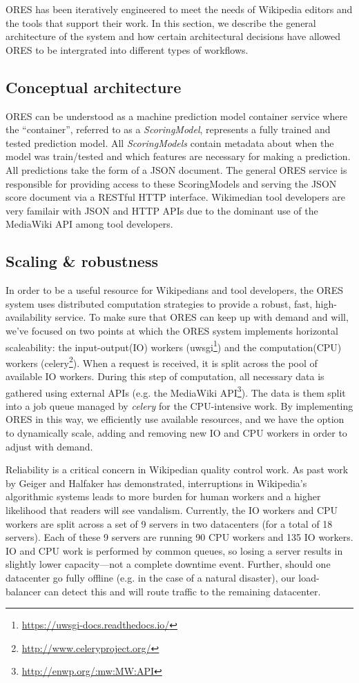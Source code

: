 ORES has been iteratively engineered to meet the needs of Wikipedia editors and the tools that support their work.  In this section, we describe the general architecture of the system and how certain architectural decisions have allowed ORES to be intergrated into different types of workflows.  

\subsection{Conceptual architecture}
ORES can be understood as a machine prediction model container service where the ``container'', referred to as a \emph{ScoringModel}, represents a fully trained and tested prediction model.  All \emph{ScoringModels} contain metadata about when the model was train/tested and which features are necessary for making a prediction.  All predictions take the form of a JSON document.  The general ORES service is responsible for providing access to these ScoringModels and serving the JSON score document via a RESTful HTTP interface.  Wikimedian tool developers are very familair with JSON and HTTP APIs due to the dominant use of the MediaWiki API among tool developers.

\subsection{Scaling & robustness}
In order to be a useful resource for Wikipedians and tool developers, the ORES system uses distributed computation strategies to provide a robust, fast, high-availability service.  To make sure that ORES can keep up with demand and will, we've focused on two points at which the ORES system implements horizontal scaleability: the input-output(IO) workers (uwsgi\footnote{\url{https://uwsgi-docs.readthedocs.io/}}) and the computation(CPU) workers (celery\footnote{\url{http://www.celeryproject.org/}}).  When a request is received, it is split across the pool of available IO workers.  During this step of computation, all necessary data is gathered using external APIs (e.g. the MediaWiki API\footnote{\url{http://enwp.org/:mw:MW:API}}).  The data is them split into a job queue managed by \emph{celery} for the CPU-intensive work.  By implementing ORES in this way, we efficiently use available resources, and we have the option to dynamically scale, adding and removing new IO and CPU workers in order to adjust with demand.

Reliability is a critical concern in Wikipedian quality control work.  As past work by Geiger and Halfaker has demonstrated, interruptions in Wikipedia's algorithmic systems leads to more burden for human workers and a higher likelihood that readers will see vandalism\cite{geiger13levee}. Currently, the IO workers and CPU workers are split across a set of 9 servers in two datacenters (for a total of 18 servers).  Each of these 9 servers are running 90 CPU workers and 135 IO workers.  IO and CPU work is performed by common queues, so losing a server results in slightly lower capacity---not a complete downtime event.  Further, should one datacenter go fully offline (e.g. in the case of a natural disaster), our load-balancer can detect this and will route traffic to the remaining datacenter.

